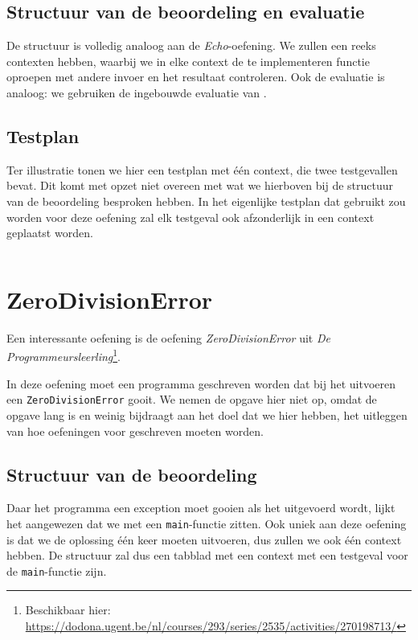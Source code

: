 \subsection{Structuur van de beoordeling en evaluatie}\label{subsec:oefening-echofunctie-structuur}

De structuur is volledig analoog aan de \emph{Echo}-oefening.
We zullen een reeks contexten hebben, waarbij we in elke context de te implementeren functie oproepen met andere invoer en het resultaat controleren.
Ook de evaluatie is analoog: we gebruiken de ingebouwde evaluatie van \tested{}.

\subsection{Testplan}\label{subsec:oefening-echofunctie-testplan}

Ter illustratie tonen we hier een testplan met één context, die twee testgevallen bevat.
Dit komt met opzet niet overeen met wat we hierboven bij de structuur van de beoordeling besproken hebben.
In het eigenlijke testplan dat gebruikt zou worden voor deze oefening zal elk testgeval ook afzonderlijk in een context geplaatst worden.

\inputminted{json}{sources/echo-function/one-testcase.tson}

\section{ZeroDivisionError}\label{sec:oefening-zero}

Een interessante oefening is de oefening \emph{ZeroDivisionError} uit \emph{De Programmeursleerling}\footnote{Beschikbaar hier: \url{https://dodona.ugent.be/nl/courses/293/series/2535/activities/270198713/}}.

In deze oefening moet een programma geschreven worden dat bij het uitvoeren een \texttt{ZeroDivisionError} gooit.
We nemen de opgave hier niet op, omdat de opgave lang is en weinig bijdraagt aan het doel dat we hier hebben, het uitleggen van hoe oefeningen voor \tested{} geschreven moeten worden.

\subsection{Structuur van de beoordeling}\label{subsec:oefening-zero-structuur}

Daar het programma een exception moet gooien als het uitgevoerd wordt, lijkt het aangewezen dat we met een \texttt{main}-functie zitten.
Ook uniek aan deze oefening is dat we de oplossing één keer moeten uitvoeren, dus zullen we ook één context hebben.
De structuur zal dus een tabblad met een context met een testgeval voor de \texttt{main}-functie zijn.

